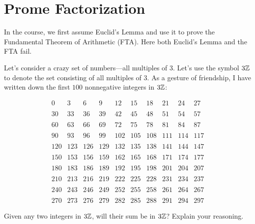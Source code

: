 \newpage
\section{Prome Factorization}\label{A:Prome}

\begin{teachingnote}
In the course, we first assume Euclid's Lemma and use it to prove the Fundamental Theorem of Arithmetic (FTA).  Here both Euclid's Lemma and the FTA fail.
\end{teachingnote}

Let's consider a crazy set of numbers---all multiples of $3$. Let's
use the symbol $3\mathbb Z$ to denote the set consisting of all multiples of
$3$. As a gesture of friendship, I have written down the first $100$
nonnegative integers in $3\mathbb Z$:

\[
\begin{array}{cccccccccc}
0   & 3   & 6   & 9   & 12  & 15  & 18  & 21  & 24  & 27  \\
\\
30  & 33  & 36  & 39  & 42  & 45  & 48  & 51  & 54  & 57  \\
\\
60  & 63  & 66  & 69  & 72  & 75  & 78  & 81  & 84  & 87  \\
\\
90  & 93  & 96  & 99  & 102 & 105 & 108 & 111 & 114 & 117 \\
\\
120 & 123 & 126 & 129 & 132 & 135 & 138 & 141 & 144 & 147 \\
\\
150 & 153 & 156 & 159 & 162 & 165 & 168 & 171 & 174 & 177 \\
\\
180 & 183 & 186 & 189 & 192 & 195 & 198 & 201 & 204 & 207 \\
\\
210 & 213 & 216 & 219 & 222 & 225 & 228 & 231 & 234 & 237 \\
\\
240 & 243 & 246 & 249 & 252 & 255 & 258 & 261 & 264 & 267 \\
\\
270 & 273 & 276 & 279 & 282 & 285 & 288 & 291 & 294 & 297
\end{array}
\]



\begin{prob}
Given any two integers in $3\mathbb Z$, will their sum be in $3\mathbb Z$? Explain
your reasoning.
\end{prob}

